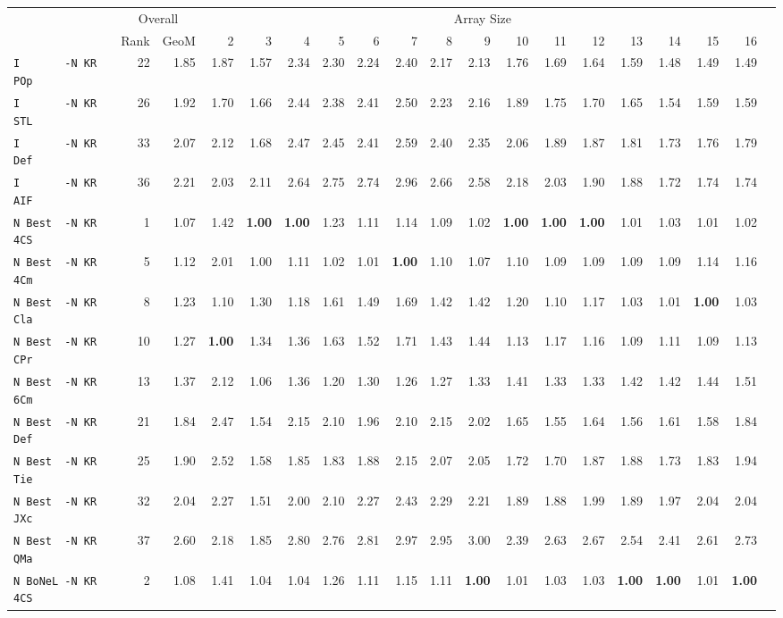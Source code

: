 \begin{tabular}{l | r @{~~} r | r@{~~}r@{~~}r@{~~}r@{~~}r@{~~}r@{~~}r@{~~}r@{~~}r@{~~}r@{~~}r@{~~}r@{~~}r@{~~}r@{~~}r@{~~}r|}
 & \multicolumn{2}{c|}{Overall} & \multicolumn{15}{c}{Array Size} \\
 & Rank & GeoM & 2&3&4&5&6&7&8&9&10&11&12&13&14&15&16\\ \hline
\verb+I       -N KR POp+ & 22 & 1.85 & 1.87&1.57&2.34&2.30&2.24&2.40&2.17&2.13&1.76&1.69&1.64&1.59&1.48&1.49&1.49\\
\verb+I       -N KR STL+ & 26 & 1.92 & 1.70&1.66&2.44&2.38&2.41&2.50&2.23&2.16&1.89&1.75&1.70&1.65&1.54&1.59&1.59\\
\verb+I       -N KR Def+ & 33 & 2.07 & 2.12&1.68&2.47&2.45&2.41&2.59&2.40&2.35&2.06&1.89&1.87&1.81&1.73&1.76&1.79\\
\verb+I       -N KR AIF+ & 36 & 2.21 & 2.03&2.11&2.64&2.75&2.74&2.96&2.66&2.58&2.18&2.03&1.90&1.88&1.72&1.74&1.74\smallskip \\
\verb+N Best  -N KR 4CS+ & 1 & 1.07 & 1.42&\textbf{1.00}&\textbf{1.00}&1.23&1.11&1.14&1.09&1.02&\textbf{1.00}&\textbf{1.00}&\textbf{1.00}&1.01&1.03&1.01&1.02\\
\verb+N Best  -N KR 4Cm+ & 5 & 1.12 & 2.01&1.00&1.11&1.02&1.01&\textbf{1.00}&1.10&1.07&1.10&1.09&1.09&1.09&1.09&1.14&1.16\\
\verb+N Best  -N KR Cla+ & 8 & 1.23 & 1.10&1.30&1.18&1.61&1.49&1.69&1.42&1.42&1.20&1.10&1.17&1.03&1.01&\textbf{1.00}&1.03\\
\verb+N Best  -N KR CPr+ & 10 & 1.27 & \textbf{1.00}&1.34&1.36&1.63&1.52&1.71&1.43&1.44&1.13&1.17&1.16&1.09&1.11&1.09&1.13\\
\verb+N Best  -N KR 6Cm+ & 13 & 1.37 & 2.12&1.06&1.36&1.20&1.30&1.26&1.27&1.33&1.41&1.33&1.33&1.42&1.42&1.44&1.51\\
\verb+N Best  -N KR Def+ & 21 & 1.84 & 2.47&1.54&2.15&2.10&1.96&2.10&2.15&2.02&1.65&1.55&1.64&1.56&1.61&1.58&1.84\\
\verb+N Best  -N KR Tie+ & 25 & 1.90 & 2.52&1.58&1.85&1.83&1.88&2.15&2.07&2.05&1.72&1.70&1.87&1.88&1.73&1.83&1.94\\
\verb+N Best  -N KR JXc+ & 32 & 2.04 & 2.27&1.51&2.00&2.10&2.27&2.43&2.29&2.21&1.89&1.88&1.99&1.89&1.97&2.04&2.04\\
\verb+N Best  -N KR QMa+ & 37 & 2.60 & 2.18&1.85&2.80&2.76&2.81&2.97&2.95&3.00&2.39&2.63&2.67&2.54&2.41&2.61&2.73\smallskip \\
\verb+N BoNeL -N KR 4CS+ & 2 & 1.08 & 1.41&1.04&1.04&1.26&1.11&1.15&1.11&\textbf{1.00}&1.01&1.03&1.03&\textbf{1.00}&\textbf{1.00}&1.01&\textbf{1.00}\\

\end{tabular}
